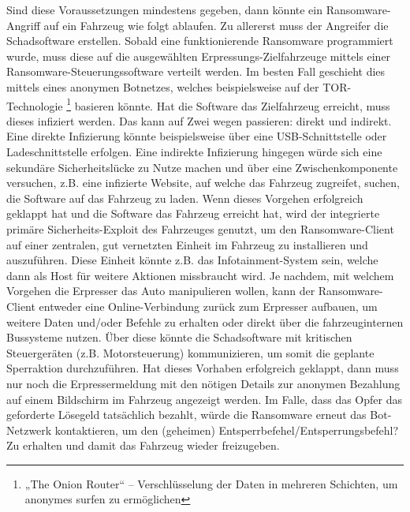 Sind diese Voraussetzungen mindestens gegeben, dann könnte ein Ransomware-Angriff auf ein 
Fahrzeug wie folgt ablaufen.
\newline
Zu allererst muss der Angreifer die Schadsoftware erstellen. Sobald eine funktionierende 
Ransomware programmiert wurde, muss diese auf die ausgewählten Erpressungs-Zielfahrzeuge 
mittels einer Ransomware-Steuerungssoftware verteilt werden. Im besten Fall geschieht dies 
mittels eines anonymen Botnetzes, welches beispielsweise auf der TOR-Technologie 
\footnote{„The Onion Router“ – Verschlüsselung der Daten in mehreren Schichten, um anonymes 
surfen zu ermöglichen} basieren könnte. 
\newline
Hat die Software das Zielfahrzeug erreicht, muss dieses infiziert werden. Das kann auf Zwei 
wegen passieren: direkt und indirekt. 
\newline
Eine direkte Infizierung könnte beispielsweise über eine USB-Schnittstelle oder Ladeschnittstelle 
erfolgen. Eine indirekte Infizierung hingegen würde sich eine sekundäre Sicherheitslücke zu Nutze 
machen und über eine Zwischenkomponente versuchen, z.B. eine infizierte Website, auf welche das 
Fahrzeug zugreifet, suchen, die Software auf das Fahrzeug zu laden. 
\newline
Wenn dieses Vorgehen erfolgreich geklappt hat und die Software das Fahrzeug erreicht hat, wird 
der integrierte primäre Sicherheits-Exploit des Fahrzeuges genutzt, um den Ransomware-Client auf 
einer zentralen, gut vernetzten Einheit im Fahrzeug zu installieren und auszuführen. Diese Einheit 
könnte z.B. das Infotainment-System sein, welche dann als Host für weitere Aktionen missbraucht 
wird.
\newline
Je nachdem, mit welchem Vorgehen die Erpresser das Auto manipulieren wollen, kann der 
Ransomware-Client entweder eine Online-Verbindung zurück zum Erpresser aufbauen, um weitere 
Daten und/oder Befehle zu erhalten oder direkt über die fahrzeuginternen Bussysteme nutzen. 
Über diese könnte die Schadsoftware mit kritischen Steuergeräten (z.B. Motorsteuerung) 
kommunizieren, um somit die geplante Sperraktion durchzuführen. 
\newline
Hat dieses Vorhaben erfolgreich geklappt, dann muss nur noch die Erpressermeldung mit den 
nötigen Details zur anonymen Bezahlung auf einem Bildschirm im Fahrzeug angezeigt werden. 
Im Falle, dass das Opfer das geforderte Lösegeld tatsächlich bezahlt, würde die Ransomware 
erneut das Bot-Netzwerk kontaktieren, um den (geheimen) Entsperrbefehel/Entsperrungsbefehl? 
Zu erhalten und damit das Fahrzeug wieder freizugeben.
